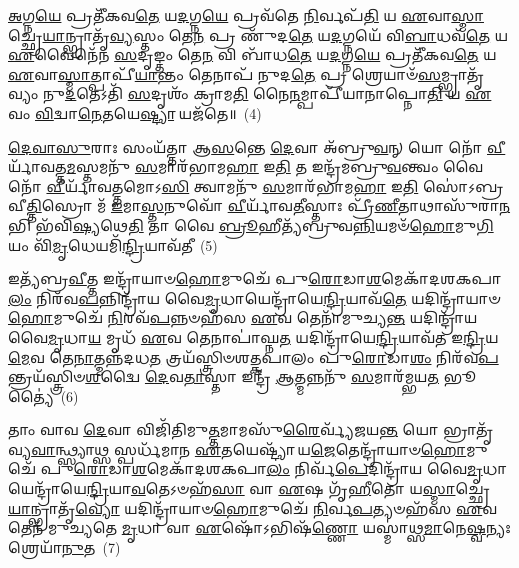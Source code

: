 \-\ul{𑌅}\-𑌗𑍍𑌨\-\ul{𑌯𑍇} 𑌪𑍍𑌰𑌤𑍀᳴𑌕𑌵\-\ul{𑌤𑍇} 𑌯\-\ul{𑌦}\-𑌗𑍍𑌨\-\ul{𑌯𑍇} 𑌪𑍍𑌰𑌵᳴𑌤𑍇 \ul{𑌨𑌿}\-𑌰𑍍𑌵𑌪᳴\-\ul{𑌤𑌿} 𑌯 \ul{𑌏}\-𑌵𑌾\-\ul{𑌸𑍍𑌮𑌾}\-𑌚𑍍𑌛𑍍𑌰𑍇\-\ul{𑌯𑌾}\-𑌨𑍍𑌭𑍍𑌰𑌾𑌤𑍃᳴\-\ul{𑌵𑍍𑌯}\-𑌸𑍍𑌤𑌂 𑌤𑍇\-\ul{𑌨} 𑌪𑍍𑌰 𑌣𑍁᳴𑌦\-\ul{𑌤𑍇} 𑌯\-\ul{𑌦}\-𑌗𑍍𑌨𑌯𑍇᳴ 𑌵𑌿\-\ul{𑌬𑌾}\-𑌧𑌵᳴\-\ul{𑌤𑍇} 𑌯 \ul{𑌏}\-𑌵𑍈𑌨𑍇᳴𑌨 \ul{𑌸}\-𑌦𑍃𑌙𑍍𑌤𑌂 𑌤𑍇\-\ul{𑌨} 𑌵𑌿 𑌬𑌾᳴𑌧\-\ul{𑌤𑍇} 𑌯\-\ul{𑌦}\-𑌗𑍍𑌨\-\ul{𑌯𑍇} 𑌪𑍍𑌰𑌤𑍀᳴𑌕𑌵\-\ul{𑌤𑍇} 𑌯 \ul{𑌏}\-𑌵𑌾\-\ul{𑌸𑍍𑌮𑌾}\-𑌤𑍍𑌪𑌾𑌪𑍀᳴\-\ul{𑌯𑌾}\-𑌨𑍍𑌤𑌂 𑌤𑍇𑌨𑌾𑌪᳴ 𑌨𑍁𑌦\-\ul{𑌤𑍇} 𑌪𑍍𑌰 𑌶𑍍𑌰𑍇𑌯𑌾𑍞᳴\-\ul{𑌸}\-𑌮𑍍𑌭𑍍𑌰𑌾𑌤𑍃᳴𑌵𑍍𑌯𑌂 𑌨𑍁\-\ul{𑌦}\-𑌤𑍇\-𑌽𑌤𑌿᳴ \ul{𑌸}\-𑌦𑍃𑌶𑌂᳴ 𑌕𑍍𑌰𑌾𑌮\-\ul{𑌤𑌿} 𑌨𑍈\-\ul{𑌨}\-𑌮𑍍𑌪𑌾𑌪𑍀᳴𑌯𑌾𑌨𑌾𑌪𑍍𑌨𑍋\-\ul{𑌤𑌿} 𑌯 \ul{𑌏}\-𑌵𑌂 \ul{𑌵𑌿}\-𑌦𑍍𑌵𑌾\-\ul{𑌨𑍇}\-𑌤𑌯𑍇\-\ul{𑌷𑍍𑌟𑍍𑌯𑌾} 𑌯𑌜᳴𑌤𑍇॥~(4)

{\anuvakamend[{\-\ul{𑌵𑍃}\-\-\ul{𑌣𑌾}\-\-\ul{𑌮}\-\-\ul{𑌹𑍈} 𑌯\-\ul{𑌤𑍍𑌪𑍁}\-𑌰\-\ul{𑌸𑍍𑌤𑌾}\-𑌦𑍍𑌰𑌕𑍍𑌷𑌾𑍞᳴𑌸𑌿 𑌵𑌪𑍇\-\ul{𑌦}\-𑌗𑍍𑌨𑌯𑍇᳴ 𑌵𑌿\-\ul{𑌬𑌾}\-𑌧𑌵᳴𑌤 \ul{𑌏}\-𑌵𑌂 \ul{𑌚}\-𑌤𑍍𑌵𑌾𑌰𑌿᳴ 𑌚}]}%

\-\ul{𑌦𑍇}\-\-\ul{𑌵𑌾}\-\-\ul{𑌸𑍁}\-𑌰𑌾𑌃 𑌸𑌂𑌯᳴𑌤𑍍𑌤𑌾 𑌆\-\ul{𑌸}\-𑌨𑍍𑌤𑍇 \ul{𑌦𑍇}\-𑌵𑌾 𑌅᳴𑌬𑍍𑌰𑍁\-\ul{𑌵}\-𑌨𑍍 𑌯𑍋 𑌨𑍋᳴ \ul{𑌵𑍀}\-𑌰𑍍𑌯𑌾᳴𑌵𑌤𑍍𑌤\-\ul{𑌮}\-𑌸𑍍𑌤𑌮𑌨𑍁᳴ \ul{𑌸}\-𑌮𑌾𑌰᳴𑌭𑌾𑌮\-\ul{𑌹𑌾} 𑌇\-\ul{𑌤𑌿} 𑌤 𑌇𑌨𑍍𑌦𑍍𑌰᳴𑌮𑌬𑍍𑌰𑍁\-\ul{𑌵}\-𑌨𑍍𑌤𑍍𑌵𑌂 𑌵𑍈 𑌨𑍋᳴ \ul{𑌵𑍀}\-𑌰𑍍𑌯𑌾᳴𑌵𑌤𑍍𑌤𑌮𑍋\-𑌽\-\ul{𑌸𑌿} 𑌤𑍍𑌵𑌾𑌮𑌨𑍁᳴ \ul{𑌸}\-𑌮𑌾𑌰᳴𑌭𑌾𑌮\-\ul{𑌹𑌾} 𑌇\-\ul{𑌤𑌿} 𑌸𑍋॑\-𑌽𑌬𑍍𑌰𑌵𑍀\-\ul{𑌤𑍍𑌤𑌿}\-𑌸𑍍𑌰𑍋 𑌮᳴ \ul{𑌇}\-𑌮𑌾\-\ul{𑌸𑍍𑌤}\-𑌨𑍁𑌵𑍋᳴ \ul{𑌵𑍀}\-𑌰𑍍𑌯𑌾᳴𑌵\-\ul{𑌤𑍀}\-𑌸𑍍𑌤𑌾𑌃 𑌪𑍍𑌰𑍀᳴\-\ul{𑌣𑍀}\-𑌤𑌾𑌥𑌾𑌸𑍁᳴𑌰𑌾\-\ul{𑌨}\-𑌭𑌿 𑌭᳴𑌵𑌿\-\ul{𑌷𑍍𑌯}\-𑌥𑍇\-\ul{𑌤𑌿} 𑌤𑌾 𑌵𑍈 \ul{𑌬𑍍𑌰𑍂}\-𑌹𑍀𑌤𑍍𑌯᳴𑌬𑍍𑌰𑍁𑌵\-\ul{𑌨𑍍𑌨𑌿}\-𑌯𑌮𑍞᳴\-\ul{𑌹𑍋}\-𑌮𑍁\-\ul{𑌗𑌿}\-𑌯𑌂 𑌵𑌿᳴\-\ul{𑌮𑍃}\-𑌧𑍇𑌯𑌮𑌿᳴\-\ul{𑌨𑍍𑌦𑍍𑌰𑌿}\-𑌯𑌾𑌵᳴𑌤𑍀~(5)

𑌇𑌤𑍍𑌯᳴𑌬𑍍𑌰\-\ul{𑌵𑍀}\-𑌤𑍍𑌤 𑌇𑌨𑍍𑌦𑍍𑌰𑌾᳴𑌯𑌾𑍞\-\ul{𑌹𑍋}\-𑌮𑍁𑌚𑍇᳴ 𑌪𑍁\-\ul{𑌰𑍋}\-𑌡𑌾\-\ul{𑌶}\-𑌮𑍇𑌕𑌾᳴\-𑌦𑌶\-𑌕𑌪𑌾\-\ul{𑌲𑌂} 𑌨𑌿𑌰᳴𑌵\-\ul{𑌪}\-𑌨𑍍𑌨𑌿𑌨𑍍𑌦𑍍𑌰𑌾᳴𑌯 𑌵𑍈\-\ul{𑌮𑍃}\-𑌧𑌾𑌯𑍇𑌨𑍍𑌦𑍍𑌰𑌾᳴𑌯𑍇\-\ul{𑌨𑍍𑌦𑍍𑌰𑌿}\-𑌯𑌾𑌵᳴\-\ul{𑌤𑍇} 𑌯𑌦𑌿𑌨𑍍𑌦𑍍𑌰𑌾᳴𑌯𑌾𑍞\-\ul{𑌹𑍋}\-𑌮𑍁𑌚𑍇᳴ \ul{𑌨𑌿}\-𑌰𑌵᳴\-\ul{𑌪}\-𑌨𑍍𑌨𑍞𑌹᳴𑌸 \ul{𑌏}\-𑌵 𑌤𑍇𑌨𑌾᳴𑌮𑍁𑌚𑍍𑌯\-\ul{𑌨𑍍𑌤} 𑌯𑌦𑌿𑌨𑍍𑌦𑍍𑌰𑌾᳴𑌯 𑌵𑍈\-\ul{𑌮𑍃}\-𑌧𑌾\-\ul{𑌯} 𑌮𑍃𑌧᳴ \ul{𑌏}\-𑌵 𑌤𑍇𑌨𑌾𑌪𑌾॑𑌘𑍍𑌨\-\ul{𑌤} 𑌯𑌦𑌿𑌨𑍍𑌦𑍍𑌰𑌾᳴𑌯𑍇\-\ul{𑌨𑍍𑌦𑍍𑌰𑌿}\-𑌯𑌾𑌵᳴𑌤 𑌇\-\ul{𑌨𑍍𑌦𑍍𑌰𑌿}\-𑌯\-\ul{𑌮𑍇}\-𑌵 𑌤𑍇\-\ul{𑌨𑌾}\-𑌤𑍍𑌮𑌨𑍍𑌨᳴𑌦𑌧\-\ul{𑌤} 𑌤𑍍𑌰𑌯᳴𑌸𑍍𑌤𑍍𑌰𑌿𑍞𑌶𑌤𑍍𑌕𑌪𑌾𑌲𑌂 𑌪𑍁\-\ul{𑌰𑍋}\-𑌡𑌾\-\ul{𑌶𑌂} 𑌨𑌿𑌰᳴𑌵\-\ul{𑌪}\-𑌨𑍍𑌤𑍍𑌰𑌯᳴𑌸𑍍𑌤𑍍𑌰𑌿𑍞\-\ul{𑌶}\-𑌦𑍍𑌵𑍈 \ul{𑌦𑍇}\-𑌵\-\ul{𑌤𑌾}\-𑌸𑍍𑌤𑌾 𑌇𑌨𑍍𑌦𑍍𑌰᳴ \ul{𑌆}\-𑌤𑍍𑌮𑌨𑍍𑌨𑌨𑍁᳴ \ul{𑌸}\-𑌮𑌾𑌰᳴𑌮𑍍𑌭𑌯\-\ul{𑌤} 𑌭𑍂𑌤𑍍𑌯𑍈॑~(6)

𑌤𑌾𑌂 𑌵𑌾𑌵 \ul{𑌦𑍇}\-𑌵𑌾 𑌵𑌿𑌜𑌿᳴𑌤𑌿𑌮𑍁\-\ul{𑌤𑍍𑌤}\-𑌮𑌾𑌮𑌸𑍁᳴\-\ul{𑌰𑍈}\-𑌰𑍍𑌵𑍍𑌯᳴𑌜𑌯\-\ul{𑌨𑍍𑌤} 𑌯𑍋 𑌭𑍍𑌰𑌾𑌤𑍃᳴𑌵𑍍𑌯\-\ul{𑌵𑌾}\-𑌨𑍍𑌥𑍍𑌸𑍍𑌯𑌾𑌥𑍍𑌸 𑌸𑍍𑌪𑌰𑍍𑌧᳴𑌮𑌾𑌨 \ul{𑌏}\-𑌤𑌯𑍇𑌷𑍍𑌟𑍍𑌯𑌾᳴ 𑌯\-\ul{𑌜𑍇}\-𑌤𑍇𑌨𑍍𑌦𑍍𑌰𑌾᳴𑌯𑌾𑍞\-\ul{𑌹𑍋}\-𑌮𑍁𑌚𑍇᳴ 𑌪𑍁\-\ul{𑌰𑍋}\-𑌡𑌾\-\ul{𑌶}\-𑌮𑍇𑌕𑌾᳴\-𑌦𑌶\-𑌕𑌪𑌾\-\ul{𑌲𑌂} 𑌨𑌿𑌰𑍍𑌵᳴\-\ul{𑌪𑍇}\-𑌦𑌿𑌨𑍍𑌦𑍍𑌰𑌾᳴𑌯 𑌵𑍈\-\ul{𑌮𑍃}\-𑌧𑌾𑌯𑍇𑌨𑍍𑌦𑍍𑌰𑌾᳴𑌯𑍇\-\ul{𑌨𑍍𑌦𑍍𑌰𑌿}\-𑌯𑌾\-\ul{𑌵}\-𑌤𑍇\-𑌽𑍞𑌹᳴\-\ul{𑌸𑌾} 𑌵𑌾 \ul{𑌏}\-𑌷 𑌗𑍃᳴\-\ul{𑌹𑍀}\-𑌤𑍋 𑌯\-\ul{𑌸𑍍𑌮𑌾}\-𑌚𑍍𑌛𑍍𑌰𑍇\-\ul{𑌯𑌾}\-𑌨𑍍𑌭𑍍𑌰𑌾𑌤𑍃᳴\-\ul{𑌵𑍍𑌯𑍋} 𑌯𑌦𑌿𑌨𑍍𑌦𑍍𑌰𑌾᳴𑌯𑌾𑍞\-\ul{𑌹𑍋}\-𑌮𑍁𑌚𑍇᳴ \ul{𑌨𑌿}\-𑌰𑍍𑌵\-\ul{𑌪}\-𑌤𑍍𑌯𑍞𑌹᳴𑌸 \ul{𑌏}\-𑌵 𑌤𑍇𑌨᳴ 𑌮𑍁𑌚𑍍𑌯𑌤𑍇 \ul{𑌮𑍃}\-𑌧𑌾 𑌵𑌾 \ul{𑌏}\-𑌷𑍋᳴\-𑌽𑌭𑌿𑌷᳴\-\ul{𑌣𑍍𑌣𑍋} 𑌯𑌸𑍍𑌮𑌾॑𑌥𑍍𑌸\-\ul{𑌮𑌾}\-𑌨𑍇\-\ul{𑌷𑍍𑌵}\-𑌨𑍍𑌯𑌃 𑌶𑍍𑌰𑍇𑌯𑌾᳴\-\ul{𑌨𑍁}\-𑌤~(7)

